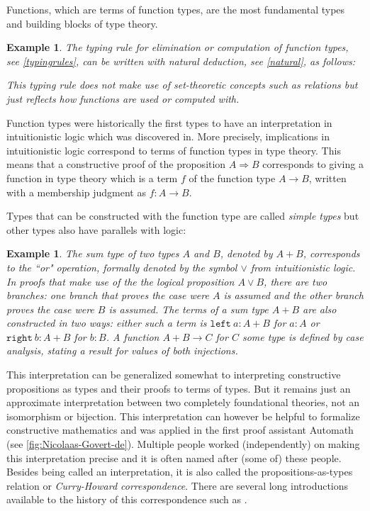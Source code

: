 \documentclass[12pt,a4paper,twoside,xetex]{book} %
\newcommand{\keyword}[1]{\emph{#1}\index{#1}}
\newtheorem{example}[theorem]{Example}
\begin{document}
Functions, which are terms of function types, are the most fundamental types and 
building blocks of type theory. 

\begin{example}\label{functionel}
The typing rule for elimination or computation of function types, see 
\cref{typingrules}, can be written with natural deduction, see \cref{natural}, as follows:
\begin{prooftree}
    \end{prooftree}
This typing rule does not make use of set-theoretic concepts such as relations 
but just reflects how functions are used or computed with.
\end{example}
    
    
Function types were historically the first types to have an interpretation in 
intuitionistic logic \cite{Heyting1930} which was discovered 
in\cite{Curry1934Nov}. More precisely, implications in intuitionistic logic 
correspond to terms of function types in type theory. This means that a 
constructive proof of the proposition $A \Rightarrow B$ corresponds to giving a 
function  in type theory which is a term $f$ of the function type $ A 
\rightarrow B$, written with a membership judgment as $f: A \rightarrow B$. 

Types that can be constructed with the function type are called \keyword{simple 
types} but other types also have parallels with logic:

\begin{example}
The \keyword{sum type} of two types $A$ and $B$, denoted by $A+B$, corresponds 
to the ``or" operation, formally denoted by the symbol $\vee$ from 
intuitionistic logic. In proofs that make use of the the logical proposition $A 
\vee B$, there are two branches: one branch that proves the case were 
$A$ is assumed and the other branch proves the case were $B$ is assumed. The terms of a sum type
$A+B$ are also constructed in two ways: either such a term is $\texttt{left}\ 
a:A+B$ for $a:A$ or $\texttt{right}\ b:A+B$ for $b:B$. A function 
$A+B\rightarrow C$ for $C$ some type is defined by case analysis, stating a 
result for values of both injections.
\end{example}

This interpretation can be generalized somewhat to interpreting constructive 
propositions as types and their proofs to terms of types. But it remains just an 
approximate interpretation between two completely foundational theories, not an 
isomorphism or bijection. This interpretation can however be helpful to 
formalize constructive mathematics and was applied in the first proof assistant 
Automath \cite{DeBruijn1970} (see \cref{fig:Nicolaas-Govert-de}). Multiple 
people worked (independently) on making this interpretation precise and it is 
often named after (some of) these people. Besides being called an 
interpretation, it is also called the propositions-as-types relation or 
\keyword{Curry-Howard correspondence}. There are several long introductions 
available to the history of this correspondence such as \cite{BibEntry2019Apr}.
\end{document}
